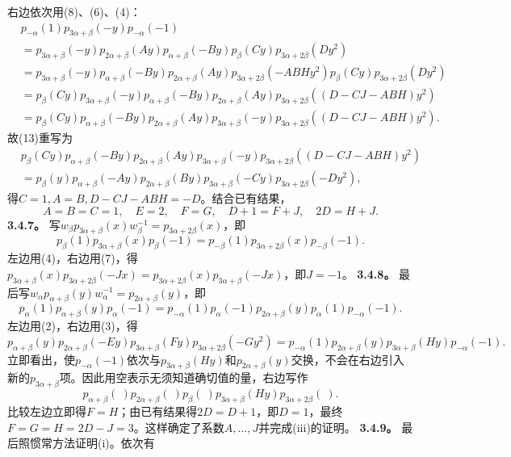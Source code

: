 右边依次用(8)、(6)、(4)：
\[\begin{aligned}{}&p_{-\alpha}(1)p_{3\alpha+\beta}(-y)p_{-\alpha}(-1)\\{}&=p_{3\alpha+\beta}(-y)p_{2\alpha+\beta}(Ay)p_{\alpha+\beta}(-By)p_\beta(Cy)p_{3\alpha+2\beta}(Dy^2)\\{}&=p_{3\alpha+\beta}(-y)p_{\alpha+\beta}(-By)p_{2\alpha+\beta}(Ay)p_{3\alpha+2\beta}(-ABHy^2)p_\beta(Cy)p_{3\alpha+2\beta}(Dy^2)\\{}&=p_\beta(Cy)p_{3\alpha+\beta}(-y)p_{\alpha+\beta}(-By)p_{2\alpha+\beta}(Ay)p_{3\alpha+2\beta}((D-CJ-ABH)y^2)\\{}&=p_\beta(Cy)p_{\alpha+\beta}(-By)p_{2\alpha+\beta}(Ay)p_{3\alpha+\beta}(-y)p_{3\alpha+2\beta}((D-CJ-ABH)y^2).\end{aligned}\]
故(13)重写为
\[\begin{aligned}{}&p_\beta(Cy)p_{\alpha+\beta}(-By)p_{2\alpha+\beta}(Ay)p_{3\alpha+\beta}(-y)p_{3\alpha+2\beta}((D-CJ-ABH)y^2)\\{}&=p_\beta(y)p_{\alpha+\beta}(-Ay)p_{2\alpha+\beta}(By)p_{3\alpha+\beta}(-Cy)p_{3\alpha+2\beta}(-Dy^2),\end{aligned}\]
得$C=1,A=B,D-CJ-ABH=-D$。结合已有结果，
\[A=B=C=1,\quad E=2,\quad F=G,\quad D+1=F+J,\quad2D=H+J.\]
\textbf{3.4.7。} 写$w_\beta p_{3\alpha+\beta}(x)w_\beta^{-1}=p_{3\alpha+2\beta}(x)$，即
\[p_\beta(1)p_{3\alpha+\beta}(x)p_\beta(-1)=p_{-\beta}(1)p_{3\alpha+2\beta}(x)p_{-\beta}(-1).\]
左边用(4)，右边用(7)，得$p_{3\alpha+\beta}(x)p_{3\alpha+2\beta}(-Jx)=p_{3\alpha+2\beta}(x)p_{3\alpha+\beta}(-Jx)$，即$J=-1$。
\textbf{3.4.8。} 最后写$w_\alpha p_{\alpha+\beta}(y)w_\alpha^{-1}=p_{2\alpha+\beta}(y)$，即
\[p_\alpha(1)p_{\alpha+\beta}(y)p_\alpha(-1)=p_{-\alpha}(1)p_\alpha(-1)p_{2\alpha+\beta}(y)p_\alpha(1)p_{-\alpha}(-1).\]
左边用(2)，右边用(3)，得
\[p_{\alpha+\beta}(y)p_{2\alpha+\beta}(-Ey)p_{3\alpha+\beta}(Fy)p_{3\alpha+2\beta}(-Gy^2)=p_{-\alpha}(1)p_{2\alpha+\beta}(y)p_{3\alpha+\beta}(Hy)p_{-\alpha}(-1).\]
立即看出，使$p_{-\alpha}(-1)$依次与$p_{3\alpha+\beta}(Hy)$和$p_{2\alpha+\beta}(y)$交换，不会在右边引入新的$p_{3\alpha+\beta}$项。因此用空表示无须知道确切值的量，右边写作
\[p_{\alpha+\beta}(\ )p_{2\alpha+\beta}(\ )p_\beta(\ )p_{3\alpha+\beta}(Hy)p_{3\alpha+2\beta}(\ ).\]
比较左边立即得$F=H$；由已有结果得$2D=D+1$，即$D=1$，最终$F=G=H=2D-J=3$。这样确定了系数$A,\ldots,J$并完成(iii)的证明。
\textbf{3.4.9。} 最后照惯常方法证明(i)。依次有

